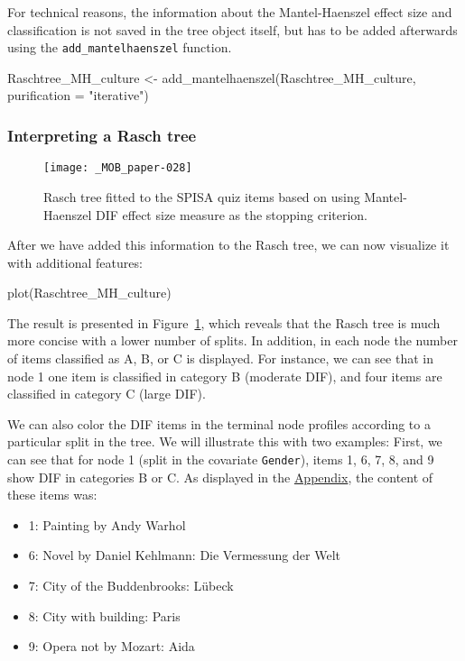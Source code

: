 \documentclass[doc,floatsintext,natbib]{apa7}
\begin{document}
For technical reasons, the information about the Mantel-Haenszel effect size and classification is not saved in the tree object itself, but has to be added afterwards using the \texttt{add\_mantelhaenszel} function.

\begin{Schunk}
\begin{Sinput}
 Raschtree_MH_culture <- add_mantelhaenszel(Raschtree_MH_culture,
                                            purification = "iterative")
\end{Sinput}
\end{Schunk}


\subsubsection{Interpreting a Rasch tree}


\begin{figure}%
\caption{Rasch tree fitted to the SPISA quiz items based on using Mantel-Haenszel DIF effect size measure as the stopping criterion.}
\texttt{[image: \_MOB\_paper-028]}
\label{fig:MHtree2}
\end{figure}%

After we have added this information to the Rasch tree, we can now visualize it with additional features: 

\begin{Schunk}
\begin{Sinput}
 plot(Raschtree_MH_culture)
\end{Sinput}
\end{Schunk}

The result is presented in Figure~\ref{fig:MHtree2}, which reveals that the Rasch tree is much more concise with a lower number of splits. In addition, in each node the number of items classified as A, B, or C is displayed. For instance, we can see that in node 1 one item is classified in category B (moderate DIF), and four items are classified in category C (large DIF).

We can also color the DIF items in the terminal node profiles according to a particular split in the tree. We will illustrate this with two examples: First, we can see that for node 1 (split in the covariate \texttt{Gender}), items 1, 6, 7, 8, and 9 show DIF in categories B or C. As displayed in the \hyperref[sec:AppendixA]{Appendix}, the content of these items was:

\begin{itemize}
\setlength\itemsep{0em}
\item 1: Painting by Andy Warhol
\item 6: Novel by Daniel Kehlmann: Die Vermessung der Welt
\item 7: City of the Buddenbrooks: Lübeck
\item 8: City with building: Paris
\item 9: Opera not by Mozart: Aida
\end{itemize}
\end{document}
